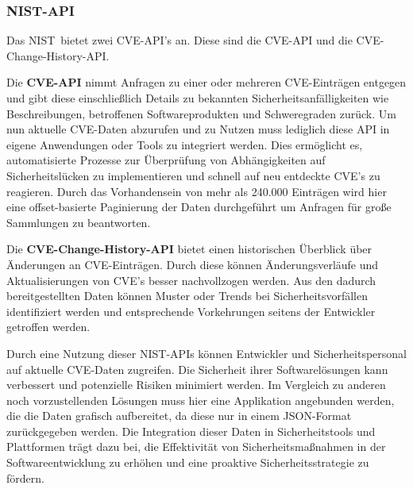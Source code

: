 \subsubsection{NIST-API} \label{sec:NIST-API}
    Das \glqq \ac{NIST}\grqq~bietet zwei \ac{CVE}-\ac{API}'s an. %
    Diese sind die \ac{CVE}-\ac{API} und die \ac{CVE}-Change-History-\ac{API}.

    Die \textbf{\ac{CVE}-\ac{API}} nimmt Anfragen zu einer oder mehreren \ac{CVE}-Einträgen entgegen und gibt diese einschließlich Details zu bekannten Sicherheitsanfälligkeiten wie Beschreibungen, betroffenen Softwareprodukten und Schweregraden zurück.
    Um nun aktuelle \ac{CVE}-Daten abzurufen und zu Nutzen muss lediglich diese \ac{API} in eigene Anwendungen oder Tools zu integriert werden.
    Dies ermöglicht es, automatisierte Prozesse zur Überprüfung von Abhängigkeiten auf Sicherheitslücken zu implementieren und schnell auf neu entdeckte \ac{CVE}'s zu reagieren.
    Durch das Vorhandensein von mehr als 240.000 Einträgen wird hier eine offset-basierte Paginierung der Daten durchgeführt um Anfragen für große Sammlungen zu beantworten.

    Die \textbf{\ac{CVE}-Change-History-\ac{API}} bietet einen historischen Überblick über Änderungen an \ac{CVE}-Einträgen.
    Durch diese können Änderungsverläufe und Aktualisierungen von \ac{CVE}'s besser nachvollzogen werden.
    Aus den dadurch bereitgestellten Daten können Muster oder Trends bei Sicherheitsvorfällen identifiziert werden und entsprechende Vorkehrungen seitens der Entwickler getroffen werden.

    Durch eine Nutzung dieser \ac{NIST}-\ac{API}s können Entwickler und Sicherheitspersonal auf aktuelle \ac{CVE}-Daten zugreifen.
    Die Sicherheit ihrer Softwarelösungen kann verbessert und potenzielle Risiken minimiert werden.
    Im Vergleich zu anderen noch vorzustellenden Lösungen muss hier eine Applikation angebunden werden, die die Daten grafisch aufbereitet, da diese nur in einem JSON-Format zurückgegeben werden. 
    Die Integration dieser Daten in Sicherheitstools und Plattformen trägt dazu bei, die Effektivität von Sicherheitsmaßnahmen in der Softwareentwicklung zu erhöhen und eine proaktive Sicherheitsstrategie zu fördern.
